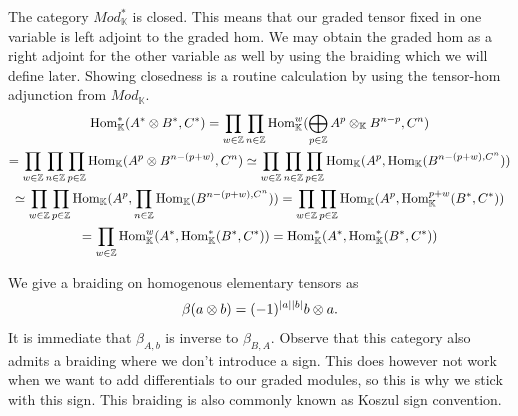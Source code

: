 \documentclass[../thesis.tex]{subfiles}
\begin{document}
            The category $Mod_\mathbb{K}^*$ is closed. This means that our graded tensor fixed in one variable is left adjoint to the graded hom. We may obtain the graded hom as a right adjoint for the other variable as well by using the braiding which we will define later. Showing closedness is a routine calculation by using the tensor-hom adjunction from $Mod_\mathbb{K}$.
            \begin{multline*}
                \tt{Hom}_\mathbb{K}^*(A^*\otimes B^*, C^*) = \prod_{w\in\mathbb{Z}}\prod_{n\in\mathbb{Z}}\tt{Hom}_\mathbb{K}^w(\bigoplus_{p\in\mathbb{Z}}A^p\otimes_\mathbb{K}B^{n-p},C^n) \\
                = \prod_{w\in\mathbb{Z}}\prod_{n\in\mathbb{Z}}\prod_{p\in\mathbb{Z}}\tt{Hom}_\mathbb{K}(A^p\otimes B^{n-(p+w)},C^n) \simeq \prod_{w\in\mathbb{Z}}\prod_{n\in\mathbb{Z}}\prod_{p\in\mathbb{Z}}\tt{Hom}_\mathbb{K}(A^p,\tt{Hom}_\mathbb{K}(B^{n-(p+w),C^n})) \\
                \simeq \prod_{w\in\mathbb{Z}}\prod_{p\in\mathbb{Z}}\tt{Hom}_\mathbb{K}(A^p, \prod_{n\in\mathbb{Z}}\tt{Hom}_\mathbb{K}(B^{n-(p+w),C^n})) = \prod_{w\in\mathbb{Z}}\prod_{p\in\mathbb{Z}}\tt{Hom}_\mathbb{K}(A^p,\tt{Hom}_\mathbb{K}^{p+w}(B^*,C^*)) \\
                = \prod_{w\in\mathbb{Z}}\tt{Hom}_\mathbb{K}^w(A^*,\tt{Hom}_\mathbb{K}^*(B^*,C^*)) = \tt{Hom}_\mathbb{K}^*(A^*,\tt{Hom}_\mathbb{K}^*(B^*,C^*))
            \end{multline*}
            
            We give a braiding on homogenous elementary tensors as
            \begin{align*}
                \beta(a\otimes b) = (-1)^{|a||b|}b\otimes a\tt{.}
            \end{align*}
            It is immediate that $\beta_{A,b}$ is inverse to $\beta_{B,A}$. Observe that this category also admits a braiding where we don't introduce a sign. This does however not work when we want to add differentials to our graded modules, so this is why we stick with this sign. This braiding is also commonly known as Koszul sign convention. 
\end{document}
